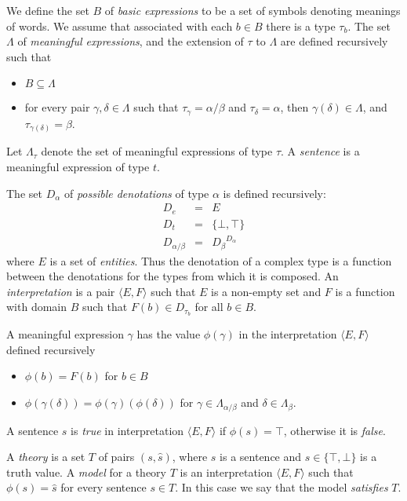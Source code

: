 \documentclass[letterpaper]{article}
\begin{document}
We define the set $B$ of \emph{basic expressions} to be a set of
symbols denoting meanings of words. We assume that associated with
each $b\in B$ there is a type $\tau_b$. The set $\Lambda$ of
\emph{meaningful expressions}, and the extension of $\tau$ to $\Lambda$ are
defined recursively such that
\begin{itemize}
\item $B\subseteq \Lambda$
\item for every pair $\gamma,\delta\in \Lambda$ such that $\tau_\gamma
  = \alpha/\beta$ and $\tau_\delta = \alpha$, then $\gamma(\delta)\in
  \Lambda$, and $\tau_{\gamma(\delta)} = \beta$.
\end{itemize}
Let $\Lambda_\tau$ denote the set of meaningful expressions of type
$\tau$. A \emph{sentence} is a meaningful expression of type $t$.


The set $D_\alpha$ of \emph{possible denotations} of type $\alpha$ is
defined recursively:
\begin{eqnarray*}
D_e &=& E\\
D_t &=& \{\bot,\top\}\\
D_{\alpha/\beta} &=& {D_\beta}^{D_\alpha}
\end{eqnarray*}
where $E$ is a set of \emph{entities}. Thus the denotation of a
complex type is a function between the denotations for the types from
which it is composed. An \emph{interpretation} is a pair $\langle E,
F\rangle$ such that $E$ is a non-empty set and $F$ is a function with
domain $B$ such that $F(b) \in D_{\tau_b}$ for all $b\in B$.

A meaningful expression $\gamma$ has the value $\phi(\gamma)$ in the
interpretation $\langle E, F\rangle$ defined recursively
\begin{itemize}
\item $\phi(b) = F(b)$ for $b\in B$
\item $\phi(\gamma(\delta)) = \phi(\gamma)(\phi(\delta))$ for $\gamma
  \in \Lambda_{\alpha/\beta}$ and $\delta \in \Lambda_\beta$.
\end{itemize}
A sentence $s$ is \emph{true} in interpretation $\langle E, F\rangle$
if $\phi(s) = \top$, otherwise it is \emph{false}.

A \emph{theory} is a set $T$ of pairs $(s,\hat{s})$, where $s$ is a
sentence and $\hat{s}\in\{\top,\bot\}$ is a truth value. A
\emph{model} for a theory $T$ is an interpretation $\langle E,
F\rangle$ such that $\phi(s) = \hat{s}$ for every sentence $s\in
T$. In this case we say that the model \emph{satisfies} $T$.
\end{document}
